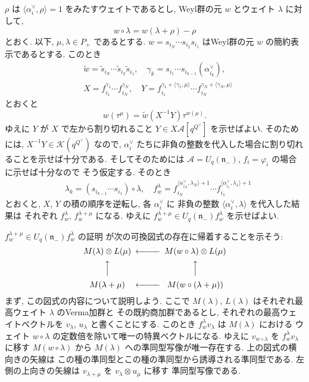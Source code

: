 \documentclass[12pt,twoside,dvipdfm]{msjproc}
\theoremstyle{definition} %
\theoremstyle{definition} %
\theoremstyle{definition} %
\numberwithin{theorem}{section}
\numberwithin{equation}{section}
\numberwithin{figure}{section}
\numberwithin{table}{section}
\newcommand\nil{\mathfrak{n}}
\newcommand\bra{\langle}
\newcommand\ket{\rangle}
\newcommand\A{\mathcal{A}}
\newcommand\K{\mathcal{K}}
\newcommand\ts{{\tilde{s}}}
\newcommand\tw{{\tilde{w}}}
\newcommand\av{\alpha^\vee}
\newcommand\Qv{{Q^\vee}}
\begin{document}
$\rho$ は $\bra\av_i,\rho\ket=1$ をみたすウェイトであるとし, 
Weyl群の元 $w$ とウェイト $\lambda$ に対して, 
\begin{equation*}
 w\circ\lambda = w(\lambda+\rho)-\rho
\end{equation*}
とおく. 以下, $\mu,\lambda\in P_+$ であるとする.
$w=s_{i_N}\cdots s_{i_2}s_{i_1}$ はWeyl群の元 $w$ の簡約表示であるとする.
このとき
\begin{align*}
 &
 \tw=\ts_{i_N}\cdots\ts_{i_2}\ts_{i_1}, \quad
 \gamma_k = s_{i_1}\cdots s_{i_{k-1}}(\av_{i_k}),
 \\ &
 X = f_{i_1}^{\gamma_1}\cdots f_{i_N}^{\gamma_N}, \quad
 Y = f_{i_1}^{\gamma_1+\bra\gamma_1,\mu\ket}
    \cdots f_{i_N}^{\gamma_N+\bra\gamma_N,\mu\ket}
\end{align*}
とおくと
\begin{equation*}
 w(\tau^\mu) = \tw\left(X^{-1}Y\right)\tau^{w(\mu)}.
\end{equation*}
ゆえに $Y$ が $X$ で左から割り切れること $Y\in X\A[q^\Qv]$ を示せばよい. 
そのためには, $X^{-1}Y\in\K(q^\Qv)$ なので, 
$\av_i$ たちに非負の整数を代入した場合に割り切れることを示せば十分である.
そしてそのためには $\A=U_q(\nil_-)$, $f_i=\varphi_i$ の場合に示せば十分なので
そう仮定する. そのとき 
\begin{align*}
  &
  \lambda_k = (s_{i_{k-1}}\cdots s_{i_1})\circ\lambda,
\quad
  f^\lambda_w = f_{i_N}^{\bra\av_{i_N},\lambda_N\ket+1}
         \cdots f_{i_1}^{\bra\av_{i_1},\lambda_1\ket+1}
\end{align*}
とおくと, $X$, $Y$ の積の順序を逆転し, 各 $\av_i$ に
非負の整数 $\bra\av_i,\lambda\ket$ を代入した結果は
それぞれ $f^\lambda_w$, $f^{\lambda+\mu}_w$ になる.
ゆえに $f^{\lambda+\mu}_w \in U_q(\nil_-)f^\lambda_w$ を示せばよい.

$f^{\lambda+\mu}_w \in U_q(\nil_-)f^\lambda_w$ の証明
が次の可換図式の存在に帰着することを示そう:
\begin{equation*}
\begin{CD}
  M(\lambda)\otimes L(\mu) @<<< M(w\circ\lambda)\otimes L(\mu) \\
  @AAA                          @AAA \\
  M(\lambda+\mu)           @<<< M(w\circ(\lambda+\mu)) \\
\end{CD}
\end{equation*}
まず, この図式の内容について説明しよう.
ここで $M(\lambda)$, $L(\lambda)$ はそれぞれ最高ウェイト $\lambda$ のVerma加群と
その既約商加群であるとし, それぞれの最高ウェイトベクトルを $v_\lambda$, $u_\lambda$
と書くことにする.  このとき $f^\lambda_w v_\lambda$ は $M(\lambda)$ における
ウェイト $w\circ\lambda$ の定数倍を除いて唯一の特異ベクトルになる.  
ゆえに $v_{w\circ\lambda}$ を $f^\lambda_w v_\lambda$ に移す $M(w\circ\lambda)$ 
から $M(\lambda)$ への準同型写像が唯一存在する. 上の図式の横向きの矢線は
この種の準同型とこの種の準同型から誘導される準同型である. 
左側の上向きの矢線は $v_{\lambda+\mu}$ を $v_\lambda\otimes u_\mu$ に移す
準同型写像である.
\end{document}
